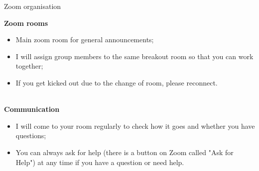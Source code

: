 \documentclass[9pt, xcolor=dvipsnames]{beamer}
\begin{document}
\begin{frame}{Zoom organisation}

\textbf{Zoom rooms}
\begin{itemize}
	\item Main zoom room for general announcements;
	\item  I will assign group members to the same breakout room so that you can work together;
	\item If you get kicked out due to the change of room, please reconnect.
\end{itemize}

~\\
\textbf{Communication}
\begin{itemize}

	\item I will come to your room regularly to check how it goes and whether you have questions;
	\item You can always ask for help (there is a button on Zoom called "Ask for Help") at any time if you have a question or need help.
\end{itemize}

\end{frame}

\end{document}
